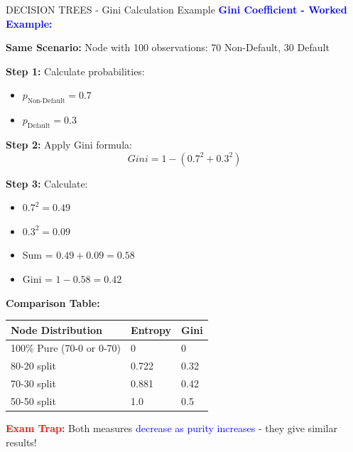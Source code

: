 \documentclass[8pt]{beamer}
\begin{document}
	\begin{frame}{DECISION TREES - Gini Calculation Example}
		\fontsize{6.5}{7.5}\selectfont
		\textcolor{blue}{\textbf{Gini Coefficient - Worked Example:}}
		
		\textbf{Same Scenario:} Node with 100 observations: 70 Non-Default, 30 Default
		
		\textbf{Step 1:} Calculate probabilities:
		\begin{itemize}
			\item $p_{\text{Non-Default}} = 0.7$
			\item $p_{\text{Default}} = 0.3$
		\end{itemize}
		
		\textbf{Step 2:} Apply Gini formula:
		\[
		Gini = 1 - (0.7^2 + 0.3^2)
		\]
		
		\textbf{Step 3:} Calculate:
		\begin{itemize}
			\item $0.7^2 = 0.49$
			\item $0.3^2 = 0.09$
			\item Sum = $0.49 + 0.09 = 0.58$
			\item Gini = $1 - 0.58 = 0.42$
		\end{itemize}
		
		\textbf{Comparison Table:}
		
		\begin{tabular}{|p{3cm}|p{3cm}|p{3cm}|}
			\hline
			\textbf{Node Distribution} & \textbf{Entropy} & \textbf{Gini} \\
			\hline
			100\% Pure (70-0 or 0-70) & 0 & 0 \\
			\hline
			80-20 split & 0.722 & 0.32 \\
			\hline
			70-30 split & 0.881 & 0.42 \\
			\hline
			50-50 split & 1.0 & 0.5 \\
			\hline
		\end{tabular}
		
		\textcolor{red}{\textbf{Exam Trap:}} Both measures \textcolor{blue}{decrease as purity increases} - they give similar results!
	\end{frame}
	
\end{document}
